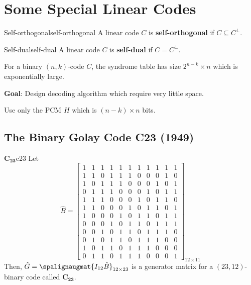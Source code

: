 \chapter{Some Special Linear Codes}

\begin{Definition}{Self-orthogonal}{self-orthogonal}
    A linear code $ C $ is \textbf{self-orthogonal} if $ C\subseteq C^{\perp} $.
\end{Definition}

\begin{Definition}{Self-dual}{self-dual}
    A linear code $ C $ is \textbf{self-dual} if $ C=C^{\perp} $.
\end{Definition}

For a binary $ (n,k) $-code $ C $, the syndrome table has
size $ 2^{n-k}\times n $ which is exponentially large.

\textbf{Goal}: Design decoding algorithm which require
very little space.

\begin{Example}{}{}
    Use only the PCM $ H $ which is $ (n-k)\times n $ bits.
\end{Example}

\section{The Binary Golay Code C23 (1949)}
\begin{Definition}{$\symbf{C_{23}}$}{c23}
    Let
    \[
        \hat{B}=
        \left[
            \begin{array}{cccccccccccc}
                1 & 1 & 1 & 1 & 1 & 1 & 1 & 1 & 1 & 1 & 1 \\
                1 & 1 & 0 & 1 & 1 & 1 & 0 & 0 & 0 & 1 & 0 \\
                1 & 0 & 1 & 1 & 1 & 0 & 0 & 0 & 1 & 0 & 1 \\
                0 & 1 & 1 & 1 & 0 & 0 & 0 & 1 & 0 & 1 & 1 \\
                1 & 1 & 1 & 0 & 0 & 0 & 1 & 0 & 1 & 1 & 0 \\
                1 & 1 & 0 & 0 & 0 & 1 & 0 & 1 & 1 & 0 & 1 \\
                1 & 0 & 0 & 0 & 1 & 0 & 1 & 1 & 0 & 1 & 1 \\
                0 & 0 & 0 & 1 & 0 & 1 & 1 & 0 & 1 & 1 & 1 \\
                0 & 0 & 1 & 0 & 1 & 1 & 0 & 1 & 1 & 1 & 0 \\
                0 & 1 & 0 & 1 & 1 & 0 & 1 & 1 & 1 & 0 & 0 \\
                1 & 0 & 1 & 1 & 0 & 1 & 1 & 1 & 0 & 0 & 0 \\
                0 & 1 & 1 & 0 & 1 & 1 & 1 & 0 & 0 & 0 & 1
            \end{array}
            \right]_{12\times{} 11} \]
    Then, $ \hat{G}=\spalignaugmat{I_{12} \hat{B}}_{12\times 23} $
    is a generator matrix for a $ (23,12) $-binary code called $ \symbf{C_{23}} $.
\end{Definition}

